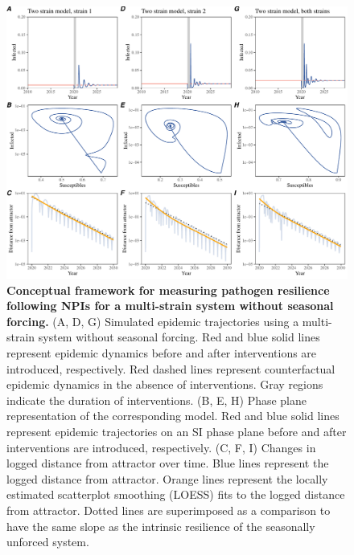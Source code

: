 \documentclass[12pt]{article}
\begin{document}
\pagebreak

\begin{figure}[!th]
\includegraphics[width=\textwidth]{../figure2/figure2_multi_noseas.pdf}
\caption{
\textbf{Conceptual framework for measuring pathogen resilience following NPIs for a multi-strain system without seasonal forcing.}
(A, D, G) Simulated epidemic trajectories using a multi-strain system without seasonal forcing.
Red and blue solid lines represent epidemic dynamics before and after interventions are introduced, respectively.
Red dashed lines represent counterfactual epidemic dynamics in the absence of interventions.
Gray regions indicate the duration of interventions.
(B, E, H) Phase plane representation of the corresponding model.
Red and blue solid lines represent epidemic trajectories on an SI phase plane before and after interventions are introduced, respectively.
(C, F, I) Changes in logged distance from attractor over time.
Blue lines represent the logged distance from attractor.
Orange lines represent the locally estimated scatterplot smoothing (LOESS) fits to the logged distance from attractor.
Dotted lines are superimposed as a comparison to have the same slope as the intrinsic resilience of the seasonally unforced system.
}
\end{figure}

\pagebreak
\end{document}
